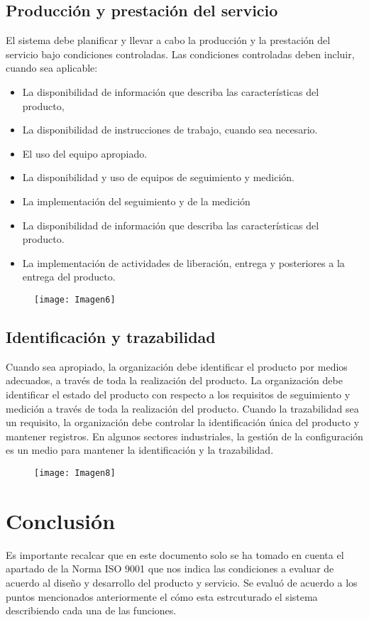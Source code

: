 \documentclass[11 pt]{article}
\begin{document}
\subsection{Producción y prestación del servicio}
El sistema debe planificar y llevar a cabo la producción y la prestación del servicio bajo condiciones controladas. Las condiciones controladas deben incluir, cuando sea aplicable:
\begin{itemize}
	\item La disponibilidad de información que describa las características del producto, 
	\item La disponibilidad de instrucciones de trabajo, cuando sea necesario.
	\item El uso del equipo apropiado.
	\item La disponibilidad y uso de equipos de seguimiento y medición.
	\item La implementación del seguimiento y de la medición
	\item La disponibilidad de información que describa las características del producto. 
	\item La implementación de actividades de liberación, entrega y posteriores a la entrega del producto. 	
\end{itemize}
\vspace{1cm}

\begin{figure}[h]
	\centering
	\texttt{[image: Imagen6]}
\end{figure}
\vspace{1cm}
\subsection{Identificación y trazabilidad}
Cuando sea apropiado, la organización debe identificar el producto por medios adecuados, a través de toda la realización del producto. La organización debe identificar el estado del producto con respecto a los requisitos de seguimiento y medición a través de toda la realización del producto. Cuando la trazabilidad sea un requisito, la organización debe controlar la identificación única del producto y
mantener registros. En algunos sectores industriales, la gestión de la configuración es un medio para mantener la identificación y
la trazabilidad.
\vspace{1cm}
\begin{figure}[h]
	\centering
	\texttt{[image: Imagen8]}
\end{figure}

\newpage

\section{Conclusión}
Es importante recalcar que en este documento solo se ha tomado en cuenta el apartado de la Norma ISO 9001 que nos indica las condiciones a evaluar de acuerdo al diseño y desarrollo del producto y servicio. Se evaluó de acuerdo a los puntos mencionados anteriormente el cómo esta estrcuturado el sistema describiendo cada una de las funciones. 
\end{document}
